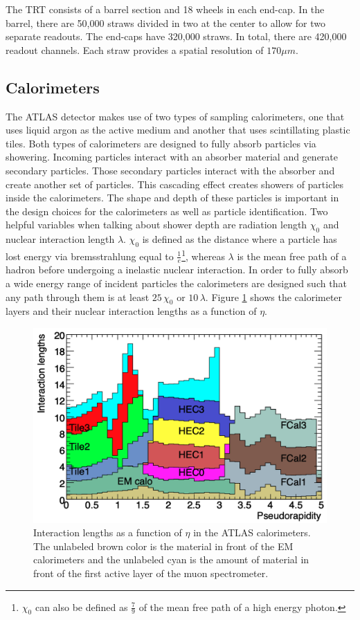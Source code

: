 			The \gls{TRT} consists of a barrel section and 18 wheels in each end-cap. In the barrel, there are 50,000 straws divided in two at the center to allow for two separate readouts. The end-caps have 320,000 straws. In total, there are 420,000 readout channels. Each straw provides a spatial resolution of $170 \mu m$. \cite{ATLAS-ID}

	\subsection{Calorimeters}\label{ssec:calorimeters}
		The ATLAS detector makes use of two types of sampling calorimeters, one that uses liquid argon as the active medium and another that uses scintillating plastic tiles. Both types of calorimeters are designed to fully absorb particles via showering. Incoming particles interact with an absorber material and generate secondary particles. Those secondary particles interact with the absorber and create another set of particles. This cascading effect creates showers of particles inside the calorimeters. The shape and depth of these particles is important in the design choices for the calorimeters as well as particle identification. Two helpful variables when talking about shower depth are radiation length $\chi_0$ and nuclear interaction length $\lambda$. $\chi_0$ is defined as the distance where a particle has lost energy via bremsstrahlung equal to $\frac{1}{e}$\footnote{$\chi_0$ can also be defined as $\frac{7}{9}$ of the mean free path of a high energy photon.}, whereas $\lambda$ is the mean free path of a hadron before undergoing a inelastic nuclear interaction. In order to fully absorb a wide energy range of incident particles the calorimeters are designed such that any path through them is at least $25 \, \chi_0$ or $10 \, \lambda$. Figure \ref{fig:calo-interaction-length} shows the calorimeter layers and their nuclear interaction lengths as a function of $\eta$.

		\begin{figure}[!ht]
		\centering
		\includegraphics[width=.65\textwidth,keepaspectratio=true]{chapters/chapter3_experiment/images/Calo_Interaction_Lengths.png}
		\caption{ Interaction lengths as a function of $\eta$ in the \gls{ATLAS} calorimeters. The unlabeled brown color is the material in front of the EM calorimeters and the unlabeled cyan is the amount of material in front of the first active layer of the muon spectrometer. \cite{atlas-experiment}}
		\label{fig:calo-interaction-length}
		\end{figure}

